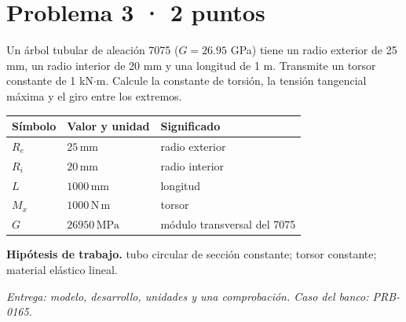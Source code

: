 \par\medskip\noindent\begin{minipage}{\linewidth}

\section{Problema 3 · 2 puntos}

Un árbol tubular de aleación 7075 ($G = 26.95$ GPa) tiene un radio exterior de 25 mm, un radio interior de 20 mm y una longitud de 1 m. Transmite un torsor constante de 1 kN$\cdot$m. Calcule la constante de torsión, la tensión tangencial máxima y el giro entre los extremos.

\par\medskip\noindent\begin{tabular}{@{}p{.18\linewidth}p{.26\linewidth}p{.48\linewidth}@{}}
\toprule Símbolo & Valor y unidad & Significado\\\midrule
$R_{e}$ & $25\,\mathrm{mm}$ & radio exterior\\
$R_{i}$ & $20\,\mathrm{mm}$ & radio interior\\
$L$ & $1000\,\mathrm{mm}$ & longitud\\
$M_{x}$ & $1000\,\mathrm{N\,m}$ & torsor\\
$G$ & $26950\,\mathrm{MPa}$ & módulo transversal del 7075\\
\bottomrule\end{tabular}\par\medskip



\par\textbf{Hipótesis de trabajo.} tubo circular de sección constante; torsor constante; material elástico lineal.

\par\textit{Entrega: modelo, desarrollo, unidades y una comprobación. Caso del banco: PRB-0165.}\end{minipage}\par\medskip

